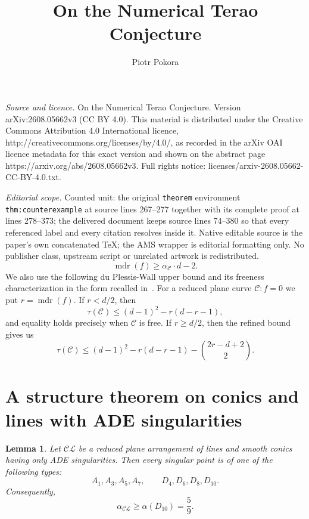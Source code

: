 \documentclass[10pt,a4paper]{amsart}
\newtheorem{lemma}[theorem]{Lemma}
\newcommand{\mdr}{\operatorname{mdr}}
\begin{document}
\title[On the Numerical Terao Conjecture]{On the Numerical Terao Conjecture}
\author{Piotr Pokora}
\date{}
\maketitle
\noindent\emph{Source and licence.} On the Numerical Terao Conjecture. Version arXiv:2608.05662v3 (CC BY 4.0). This material is distributed under the Creative Commons Attribution 4.0 International licence, http://creativecommons.org/licenses/by/4.0/, as recorded in the arXiv OAI licence metadata for this exact version and shown on the abstract page https://arxiv.org/abs/2608.05662v3. Full rights notice: licenses/arxiv-2608.05662-CC-BY-4.0.txt.\par\smallskip
\noindent\textit{Editorial scope.} Counted unit: the original \texttt{theorem} environment \texttt{thm:counterexample} at source lines 267--277 together with its complete proof at lines 278--373; the delivered document keeps source lines 74--380 so that every referenced label and every citation resolves inside it. Native editable source is the paper's own concatenated TeX; the AMS wrapper is editorial formatting only. No publisher class, upstream script or unrelated artwork is redistributed.
\begin{equation}\label{eq:DS}
 \mdr(f)\ge \alpha_{\mathcal{C}} \cdot d-2.
\end{equation}
We also use the following du Plessis-Wall upper bound \cite{DPP1} and its freeness characterization in the form recalled in~\cite{DimcaMaxTau,DimcaSticlaru}.
For a reduced plane curve $\mathcal{C} : f=0$ we put $r=\mdr(f)$.  If $r<d/2$, then
\begin{equation}\label{eq:DPW-small}
 \tau(\mathcal{C})\le (d-1)^2-r(d-r-1),
\end{equation}
and equality holds precisely when $\mathcal{C}$ is free.  If $r\ge d/2$, then the
refined bound gives us
\begin{equation}\label{eq:DPW-large}
 \tau(\mathcal{C})\le (d-1)^2-r(d-r-1) -\binom{2r-d+2}{2}.
\end{equation}

\section{A structure theorem on conics and lines with ADE singularities}

\begin{lemma}\label{lem:types}
Let $\mathcal{CL}$ be a reduced plane arrangement of lines and smooth conics having only ADE singularities.  Then every singular point is of one of the following types:
\[
 A_1,A_3,A_5,A_7,\qquad D_4,D_6,D_8,D_{10}.
\]
Consequently,
\[
 \alpha_{\mathcal{CL}}\ge \alpha(D_{10})=\frac59.
\]
\end{lemma}
\end{document}
